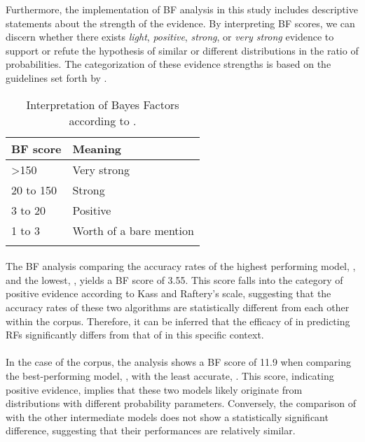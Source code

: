 Furthermore, the implementation of BF analysis in this study includes descriptive statements about the strength of the evidence. By interpreting BF scores, we can discern whether there exists \emph{light}, \emph{positive}, \emph{strong}, or \emph{very strong} evidence to support or refute the hypothesis of similar or different distributions in the ratio of probabilities. The categorization of these evidence strengths is based on the guidelines set forth by \citet{kass1995bayes}.

\begin{table}
\begin{tabularx}{.8\textwidth}{Xl}
\lsptoprule
BF score & Meaning \\
\midrule
\textgreater{}150 & Very strong \\
20 to 150 & Strong \\
3 to 20 & Positive \\
1 to 3 & Worth of a bare mention \\
\lspbottomrule
\end{tabularx}\caption[Interpretation of Bayes Factors]{\label{kaasinterp} Interpretation of Bayes Factors according to \citet[777]{kass1995bayes}.}
\end{table}


\paragraph*{\msrcor} 

The BF analysis comparing the accuracy rates of the highest performing model, , and the lowest, , yields a BF score of 3.55. This score falls into the category of positive evidence according to Kass and Raftery's scale, suggesting that the accuracy rates of these two algorithms are statistically different from each other within the \msrcor corpus. Therefore, it can be inferred that the efficacy of  in predicting RFs significantly differs from that of  in this specific context.

\paragraph*{\negcor} 

In the case of the \negcor corpus, the analysis shows a BF score of 11.9 when comparing the best-performing model, , with the least accurate, . This score, indicating positive evidence, implies that these two models likely originate from distributions with different probability parameters. Conversely, the comparison of  with the other intermediate models does not show a statistically significant difference, suggesting that their performances are relatively similar.

